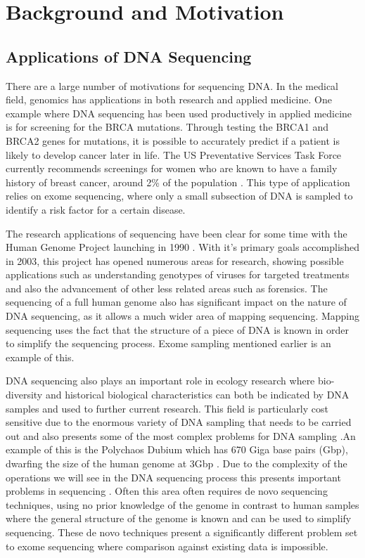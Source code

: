 \chapter{Background and Motivation}
\renewcommand{\baselinestretch}{\mystretch}
\label{chap:bg}



\section{Applications of DNA Sequencing}
There are a large number of motivations for sequencing DNA. In the medical field, genomics has applications in both research and applied medicine. One example where DNA sequencing has been used productively in applied medicine is for screening for the BRCA mutations. Through testing the BRCA1 and BRCA2 genes for mutations, it is possible to accurately predict if a patient is likely to develop cancer later in life. The US Preventative Services Task Force currently recommends screenings for women who are known to have a family history of breast cancer, around 2\% of the population \cite{USPSTF}. This type of application relies on exome sequencing, where only a small subsection of DNA is sampled to identify a risk factor for a certain disease. 

The research applications of sequencing have been clear for some time with  the Human Genome Project launching in 1990 \cite{HGP}.  With it's primary goals accomplished in 2003, this project has opened numerous areas for research, showing possible applications such as understanding genotypes of viruses for targeted treatments and also the advancement of other less related areas such as forensics. The sequencing of a full human genome also has significant impact on the nature of DNA sequencing, as it allows a much wider area of mapping sequencing. Mapping sequencing uses the fact that the structure of a piece of DNA is known in order to simplify the sequencing process. Exome sampling mentioned earlier is an example of this. 

DNA sequencing also plays an important role in ecology research where bio-diversity and historical biological characteristics can both be indicated by DNA samples and used to further current research. This field is particularly cost sensitive due to the enormous variety of DNA sampling that needs to be carried out and also presents some of the most complex problems for DNA sampling \cite{genomelength}.An example of this is the Polychaos Dubium which has 670 Giga base pairs (Gbp), dwarfing the size of the human genome at 3Gbp \cite{HGP2}. Due to the complexity of the operations we will see in the DNA sequencing process this presents important problems in sequencing \cite{parfrey2008dynamic}. Often this area often requires de novo sequencing techniques, using no prior knowledge of the genome in contrast to human samples where the general structure of the genome is known and can be used to simplify sequencing.  These de novo techniques present a significantly different problem set to exome sequencing where comparison against existing data is impossible.


